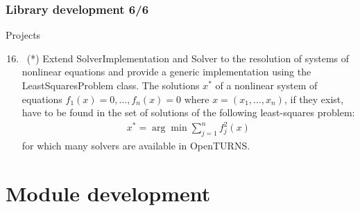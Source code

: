\documentclass[8pt]{beamer}
\begin{document}
\begin{frame}
  \frametitle{Library development 6/6}
  \begin{block}{Projects}
    \begin{enumerate}
      \setcounter{enumi}{15}
    \item~(*) Extend \alert{\ttfamily SolverImplementation} and \alert{\ttfamily Solver} to the resolution of systems of nonlinear equations and provide a generic implementation using the \alert{\ttfamily LeastSquaresProblem} class. The solutions $x^*$ of a nonlinear system of equations $f_1(x)=0,\dots,f_n(x)=0$ where $x=(x_1,\dots,x_n)$, if they exist, have to be found in the set of solutions of the following least-squares problem:
      \begin{align}
        x^*=\arg\min \sum_{j=1}^n f_j^2(x)
      \end{align}
      for which many solvers are available in OpenTURNS.
    \end{enumerate}
  \end{block}
\end{frame}

\section{Module development}
\end{document}
